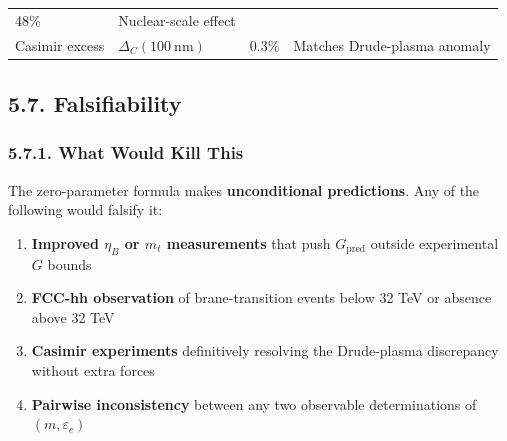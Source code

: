 \documentclass[
  11pt,
]{article}
\providecommand{\tightlist}{%
  \setlength{\itemsep}{0pt}\setlength{\parskip}{0pt}}
\begin{document}
\begin{longtable}[]{@{}llll@{}}
\begin{minipage}[t]{0.27\columnwidth}
48\%\strut
\end{minipage} & \begin{minipage}[t]{0.18\columnwidth}\raggedright
Nuclear-scale effect\strut
\end{minipage}\tabularnewline
\begin{minipage}[t]{0.27\columnwidth}\raggedright
Casimir excess\strut
\end{minipage} & \begin{minipage}[t]{0.18\columnwidth}\raggedright
\(\Delta_C(100~\text{nm})\)\strut
\end{minipage} & \begin{minipage}[t]{0.27\columnwidth}\raggedright
0.3\%\strut
\end{minipage} & \begin{minipage}[t]{0.18\columnwidth}\raggedright
Matches Drude-plasma anomaly\strut
\end{minipage}\tabularnewline
\bottomrule
\end{longtable}

\bigskip

\hypertarget{falsifiability}{%
\subsection{5.7. Falsifiability}\label{falsifiability}}

\hypertarget{what-would-kill-this}{%
\subsubsection{5.7.1. What Would Kill This}\label{what-would-kill-this}}

The zero-parameter formula makes \textbf{unconditional predictions}. Any
of the following would falsify it:

\begin{enumerate}
\def\labelenumi{\arabic{enumi}.}
\tightlist
\item
  \textbf{Improved \(\eta_B\) or \(m_t\) measurements} that push
  \(G_{\text{pred}}\) outside experimental \(G\) bounds
\item
  \textbf{FCC-hh observation} of brane-transition events below 32 TeV or
  absence above 32 TeV
\item
  \textbf{Casimir experiments} definitively resolving the Drude-plasma
  discrepancy without extra forces
\item
  \textbf{Pairwise inconsistency} between any two observable
  determinations of \((m, \varepsilon_c)\)
\end{enumerate}
\end{document}
